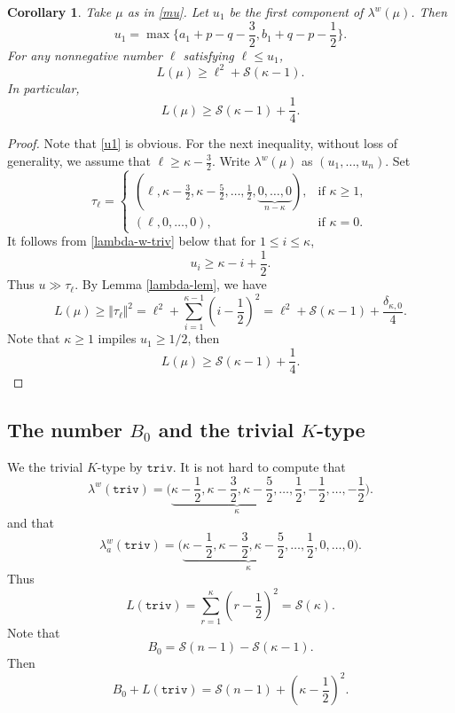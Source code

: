 \documentclass[11pt]{amsart}
\theoremstyle{plain}
\newtheorem{cor}[thm]{Corollary}
\theoremstyle{definition}
\newcommand{\caS}{\mathcal{S}}
\begin{document}
\begin{cor}\label{lambda-co}
	Take $\mu$ as in \eqref{mu}. Let $u_1$ be the first component of $\lambda^w(\mu)$. Then
	\begin{equation}\label{u1}
		u_1=\max\{a_1+p-q-\frac{3}{2},b_1+q-p-\frac{1}{2}\}.
	\end{equation}
	For any nonnegative number $\ell$ satisfying $\ell\le u_1$,
	\[L(\mu)\ge\ell^2+\caS(\kappa-1).\]
	 In particular,
	 \begin{equation}\label{L-lowest}
	 	L(\mu)\ge \caS(\kappa-1)+\frac{1}{4}.
	 \end{equation}
\end{cor}
\begin{proof}
	Note that \eqref{u1} is obvious. For the next inequality, without loss of generality, we assume that $\ell\ge \kappa-\frac{3}{2}$. Write $\lambda^w(\mu)$ as $(u_1,\dots,u_n)$. Set
	\[\tau_\ell=\left\{
	\begin{array}{ll}
		(\ell,\kappa-\frac{3}{2}, \kappa-\frac{5}{2},\dots,\frac{1}{2},\underbrace{0,\dots,0}_{n-\kappa}),& \mbox{if $\kappa\ge 1$},\\
		(\ell,0,\dots,0), &\mbox{if $\kappa=0$}.
	\end{array}
	\right.\]
	It follows from \eqref{lambda-w-triv} below that for $1\le i\le \kappa$,
	\[u_i\ge \kappa-i+\frac{1}{2}.\]
	Thus $u\gg \tau_\ell$. By Lemma \ref{lambda-lem}, we have
	\[L(\mu)\ge \Vert \tau_\ell\Vert^2=\ell^2+\sum_{i=1}^{\kappa-1}\left(i-\frac{1}{2}\right)^2=\ell^2+\caS(\kappa-1)+\frac{\delta_{\kappa,0}}{4}.\]
	Note that $\kappa\ge 1$ impiles $u_1\ge 1/2$, then
	\[L(\mu)\ge \caS(\kappa-1)+\frac{1}{4}.\]
\end{proof}

\subsection{The number $B_0$ and the trivial $K$-type}  We  the trivial $K$-type by $\texttt{triv}$. It is not hard to compute that
\begin{equation}\label{lambda-w-triv}
\lambda^w(\texttt{triv})=\bigg(\underbrace{\kappa-\frac{1}{2},\kappa-\frac{3}{2},
\kappa-\frac{5}{2},\dots,\frac{1}{2}}_{\kappa},-\frac{1}{2}, \dots, -\frac{1}{2}\bigg).
\end{equation}
and that
\[
\lambda_a^w(\texttt{triv})=\bigg(\underbrace{\kappa-\frac{1}{2},\kappa-\frac{3}{2},\kappa-\frac{5}{2},\dots,\frac{1}{2}}_{\kappa},0,\dots,0\bigg).
\]
Thus
\[L(\texttt{triv})=\sum_{r=1}^{\kappa}\left(r-\frac{1}{2}\right)^2=\caS(\kappa).\]
 Note that
 \begin{equation}\label{B0-S}
 	B_0=\caS(n-1)-\caS(\kappa-1).
\end{equation}
 Then
\begin{equation}\label{triv}
	B_0+L(\texttt{triv})=\caS(n-1)+\left(\kappa-\frac{1}{2}\right)^2.
\end{equation}
\end{document}
